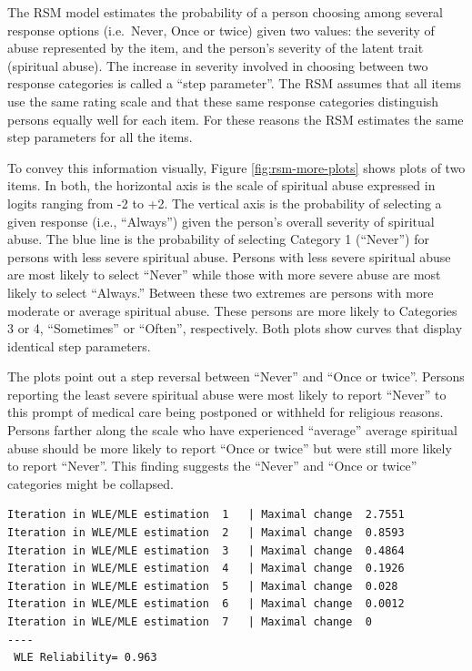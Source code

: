 \documentclass[
]{article}
\begin{document}
The RSM model estimates the probability of a person choosing among several response options (i.e.~Never, Once or twice) given two values: the severity of abuse represented by the item, and the person's severity of the latent trait (spiritual abuse). The increase in severity involved in choosing between two response categories is called a ``step parameter''. The RSM assumes that all items use the same rating scale and that these same response categories distinguish persons equally well for each item. For these reasons the RSM estimates the same step parameters for all the items.

To convey this information visually, Figure \ref{fig:rsm-more-plots} shows plots of two items. In both, the horizontal axis is the scale of spiritual abuse expressed in logits ranging from -2 to +2. The vertical axis is the probability of selecting a given response (i.e., ``Always'') given the person's overall severity of spiritual abuse. The blue line is the probability of selecting Category 1 (``Never'') for persons with less severe spiritual abuse. Persons with less severe spiritual abuse are most likely to select ``Never'' while those with more severe abuse are most likely to select ``Always.'' Between these two extremes are persons with more moderate or average spiritual abuse. These persons are more likely to Categories 3 or 4, ``Sometimes'' or ``Often'', respectively. Both plots show curves that display identical step parameters.

The plots point out a step reversal between ``Never'' and ``Once or twice''. Persons reporting the least severe spiritual abuse were most likely to report ``Never'' to this prompt of medical care being postponed or withheld for religious reasons. Persons farther along the scale who have experienced ``average'' average spiritual abuse should be more likely to report ``Once or twice'' but were still more likely to report ``Never''. This finding suggests the ``Never'' and ``Once or twice'' categories might be collapsed.

\begin{verbatim}
Iteration in WLE/MLE estimation  1   | Maximal change  2.7551 
Iteration in WLE/MLE estimation  2   | Maximal change  0.8593 
Iteration in WLE/MLE estimation  3   | Maximal change  0.4864 
Iteration in WLE/MLE estimation  4   | Maximal change  0.1926 
Iteration in WLE/MLE estimation  5   | Maximal change  0.028 
Iteration in WLE/MLE estimation  6   | Maximal change  0.0012 
Iteration in WLE/MLE estimation  7   | Maximal change  0 
----
 WLE Reliability= 0.963 
\end{verbatim}
\end{document}
